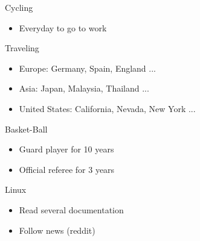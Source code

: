 \documentclass[letterpaper]{jm-cv} %
\begin{document}
\begin{multicols}{2}
  \small {

    {\color{mainblue}\faBicycle} Cycling
    {\footnotesize
      \vspace{-0.2cm}
      \begin{itemize}
      \item[\color{maingray}\faArrowRight] Everyday to go to work
      \end{itemize}
    }

    {\color{mainblue}\faUser} Traveling
        {\footnotesize
      \vspace{-0.2cm}
      \begin{itemize}
      \item[\color{maingray}\faArrowRight] Europe: Germany, Spain, England ...
      \item[\color{maingray}\faArrowRight] Asia: Japan, Malaysia, Thailand ...
      \item[\color{maingray}\faArrowRight] United States: California, Nevada, New York ...
      \end{itemize}
    }

    {\color{mainblue}\faDribbble} Basket-Ball
    {\footnotesize
      \vspace{-0.2cm}
      \begin{itemize}
      \item[\color{maingray}\faArrowRight] Guard player for 10 years
      \item[\color{maingray}\faArrowRight] Official referee for 3 years
      \end{itemize}
    }

    {\color{mainblue}\faLinux} Linux
    {\footnotesize
      \vspace{-0.2cm}
      \begin{itemize}
      \item[\color{maingray}\faArrowRight] Read several documentation
      \item[\color{maingray}\faArrowRight] Follow news (reddit)
      \end{itemize}
    }
  }

\end{multicols}
\end{document}
